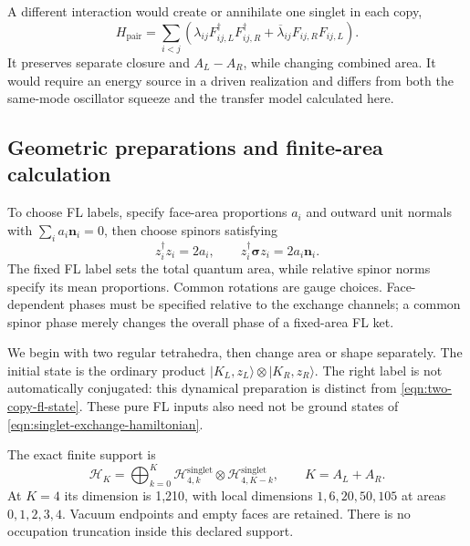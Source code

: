\documentclass[twocolumn,draft,aps,nofootinbib,nobibnotes,final]{revtex4-2}
\begin{document}
A different interaction would create or annihilate one singlet in each copy,
\begin{equation}
 H_{\mathrm{pair}}=\sum_{i<j}\left(
 \lambda_{ij}F_{ij,L}^{\dagger}F_{ij,R}^{\dagger}
 +\overline{\lambda}_{ij}F_{ij,R}F_{ij,L}\right).
\end{equation}
It preserves separate closure and $A_L-A_R$, while changing combined area. It would require an energy source in a driven realization and differs from both the same-mode oscillator squeeze and the transfer model calculated here.

\subsection{Geometric preparations and finite-area calculation}

To choose FL labels, specify face-area proportions $a_i$ and outward unit normals with $\sum_i a_i\mathbf n_i=0$, then choose spinors satisfying
\begin{equation}
 z_i^{\dagger}z_i=2a_i,\qquad
 z_i^{\dagger}\boldsymbol\sigma z_i=2a_i\mathbf n_i.
\end{equation}
The fixed FL label sets the total quantum area, while relative spinor norms specify its mean proportions. Common rotations are gauge choices. Face-dependent phases must be specified relative to the exchange channels; a common spinor phase merely changes the overall phase of a fixed-area FL ket.

We begin with two regular tetrahedra, then change area or shape separately. The initial state is the ordinary product $|K_L,z_L\rangle\otimes|K_R,z_R\rangle$. The right label is not automatically conjugated: this dynamical preparation is distinct from \eqref{eqn:two-copy-fl-state}. These pure FL inputs also need not be ground states of \eqref{eqn:singlet-exchange-hamiltonian}.

The exact finite support is
\begin{equation}
 \mathcal H_{K}=\bigoplus_{k=0}^{K}
 \mathcal H_{4,k}^{\mathrm{singlet}}\otimes
 \mathcal H_{4,K-k}^{\mathrm{singlet}},\qquad K=A_L+A_R.
\end{equation}
At $K=4$ its dimension is 1,210, with local dimensions $1,6,20,50,105$ at areas $0,1,2,3,4$. Vacuum endpoints and empty faces are retained. There is no occupation truncation inside this declared support.
\end{document}
